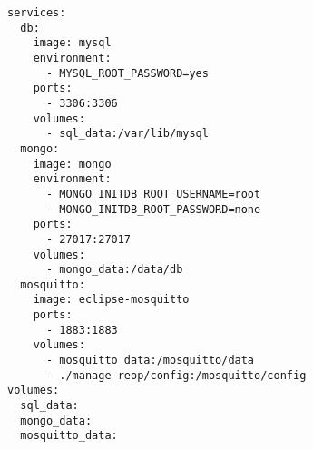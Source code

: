 
\begin{lstlisting}[language=docker-compose-2,caption={Auxiliary Services \code{docker-compose.yml}},breaklines=true,label={code::compose_helper}]
services:
  db:
    image: mysql
    environment:
      - MYSQL_ROOT_PASSWORD=yes
    ports:
      - 3306:3306
    volumes:
      - sql_data:/var/lib/mysql
  mongo:
    image: mongo
    environment:
      - MONGO_INITDB_ROOT_USERNAME=root
      - MONGO_INITDB_ROOT_PASSWORD=none
    ports:
      - 27017:27017
    volumes:
      - mongo_data:/data/db
  mosquitto:
    image: eclipse-mosquitto
    ports:
      - 1883:1883
    volumes:
      - mosquitto_data:/mosquitto/data
      - ./manage-reop/config:/mosquitto/config
volumes:
  sql_data:
  mongo_data:
  mosquitto_data:
\end{lstlisting}
